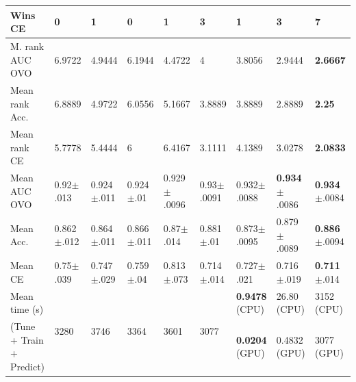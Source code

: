 \begin{tabular}{@{\hskip 0mm}
l@{\hskip 1mm}
l@{\hskip 1mm}
l@{\hskip 1mm}
l@{\hskip 1mm}
l@{\hskip 1mm}
l@{\hskip 1mm}
l@{\hskip 1mm}
l@{\hskip 1mm}
l@{\hskip 0mm}}
Wins CE                          &               0 &               1 &               0 &                1 &                3 &                1 &                         3 &                \textbf{7} \\
\midrule
M. rank AUC OVO
                                                  &          6.9722 &          4.9444 &          6.1944 &           4.4722 &                4 &           3.8056 &                    2.9444 &           \textbf{2.6667} \\
Mean rank Acc.                   &          6.8889 &          4.9722 &          6.0556 &           5.1667 &           3.8889 &           3.8889 &                    2.8889 &             \textbf{2.25} \\
Mean rank CE                     &          5.7778 &          5.4444 &               6 &           6.4167 &           3.1111 &           4.1389 &                    3.0278 &           \textbf{2.0833} \\
\midrule
Mean AUC OVO
                                                     &   0.92$\pm$.013 &  0.924$\pm$.011 &   0.924$\pm$.01 &  0.929$\pm$.0096 &   0.93$\pm$.0091 &  0.932$\pm$.0088 &  \textbf{0.934}$\pm$.0086 &  \textbf{0.934}$\pm$.0084 \\
Mean Acc.                        &  0.862$\pm$.012 &  0.864$\pm$.011 &  0.866$\pm$.011 &    0.87$\pm$.014 &    0.881$\pm$.01 &  0.873$\pm$.0095 &           0.879$\pm$.0089 &  \textbf{0.886}$\pm$.0094 \\
Mean CE                          &   0.75$\pm$.039 &  0.747$\pm$.029 &   0.759$\pm$.04 &   0.813$\pm$.073 &   0.714$\pm$.014 &   0.727$\pm$.021 &            0.716$\pm$.019 &   \textbf{0.711}$\pm$.014 \\
\midrule
Mean time (s) 
                                    &            \multirow{2}{*}{3280} &            \multirow{2}{*}{3746} &            \multirow{2}{*}{3364} &            \multirow{2}{*}{3601} &                    \multirow{2}{*}{3077} &  \textbf{0.9478} (CPU) &          26.80 (CPU) &                      3152 (CPU) \\
(Tune + Train + Predict)                                                                        &             &             &             &             &                     &  \textbf{0.0204} (GPU) &          0.4832 (GPU) &                      3077 (GPU) \\
\bottomrule
\end{tabular}